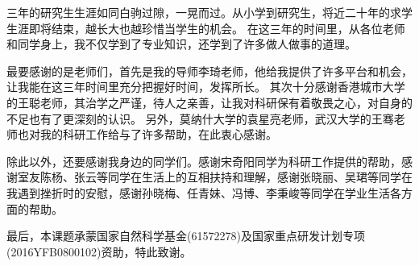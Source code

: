 \begin{acknowledgement}

  三年的研究生生涯如同白驹过隙，一晃而过。从小学到研究生，将近二十年的求学生涯即将结束，越长大也越珍惜当学生的机会。
  在这三年的时间里，从各位老师和同学身上，我不仅学到了专业知识，还学到了许多做人做事的道理。

  最要感谢的是老师们，首先是我的导师李琦老师，他给我提供了许多平台和机会，让我能在这三年时间里充分把握好时间，发挥所长。
  其次十分感谢香港城市大学的王聪老师，其治学之严谨，待人之亲善，让我对科研保有着敬畏之心，对自身的不足也有了更深刻的认识。
  另外，莫纳什大学的袁星亮老师，武汉大学的王骞老师也对我的科研工作给与了许多帮助，在此衷心感谢。

  除此以外，还要感谢我身边的同学们。感谢宋奇阳同学为科研工作提供的帮助，感谢室友陈杨、张云等同学在生活上的互相扶持和理解，感谢张晓丽、吴珺等同学在我遇到挫折时的安慰，感谢孙晓梅、任青妹、冯博、李秉峻等同学在学业生活各方面的帮助。

  最后，本课题承蒙国家自然科学基金(61572278)及国家重点研发计划专项(2016YFB0800102)资助，特此致谢。

\end{acknowledgement}

